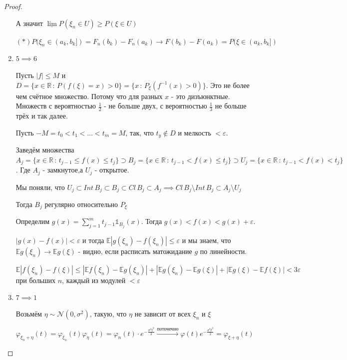 \begin{proof}
\begin{enumerate}
{            А значит $\underline{\lim} P(\xi_n \in U) \geqslant P(\xi \in U)$

            $(*) P(\xi_n \in (a_k, b_k]) = F_n (b_k) - F_n (a_k) \rightarrow F(b_k) - F(a_k) = P(\xi \in (a_k, b_k])$
        }
        \item {
            $5 \implies 6$

            Пусть $|f| \leqslant M$ и $D = \{ x \in \mathbb{R} \, : \, P(f(\xi) = x) > 0 \} = \{ x \, : \, P_{\xi} (f^{-1} (x) > 0) \}$. Это не более чем счётное множество. Потому что для разных $x$ - это дизъюнктные. 
            Множеств с вероятностью $\frac{1}{2}$ - не больше двух, с вероятностью $\frac{1}{3}$ не больше трёх и так далее.

            Пусть $-M = t_0 < t_1 < \ldots < t_m = M$, так, что $t_y \not \in D$ и мелкость $< \varepsilon$.

            Заведём множества $A_j = \{ x \in \mathbb{R} \, : \, t_{j - 1} \leqslant f(x) \leqslant t_j \} \supset B_j = \{ x \in \mathbb{R} \, : \, t_{j - 1} < f(x) \leqslant t_j \} \supset U_j = \{ x \in \mathbb{R} \, : \, t_{j - 1} < f(x) < t_j \}$. Где $A_j$ - замкнутое,а $U_j$ - открытое.

            Мы поняли, что $U_j \subset Int \, B_j \subset B_j \subset Cl \, B_j \subset A_j \implies Cl \, B_j \setminus Int \, B_j \subset A_j \setminus U_j$

            Тогда $B_j$ регулярно относительно $P_\xi$

            Определим $g(x) = \sum_{j = 1}^{m} t_{j - 1} \mathds{1}_{B_j} (x)$. Тогда $g(x) < f(x) < g(x) + \varepsilon$.

            $|g(x) - f(x)| < \varepsilon$ и тогда $\mathbb{E} |g(\xi_n) - f(\xi_n)| \leqslant \varepsilon$ и мы знаем, что $\mathbb{E}g(\xi_n) \rightarrow \mathbb{E}g(\xi)$ - видно, если расписать матожидание $g$ по линейности.

            $\mathbb{E} |f(\xi_n) - f(\xi)| \leqslant |\mathbb{E} f(\xi_n) - \mathbb{E} g(\xi_n)| + |\mathbb{E} g(\xi_n) - \mathbb{E} g(\xi)| + |\mathbb{E} g(\xi) - \mathbb{E} f(\xi) | < 3\varepsilon$ при больших $n$, каждый из модулей $< \varepsilon$
        }
        \item {
            $7 \implies 1$

            Возьмём $\eta \sim \mathcal{N} (0, \sigma^2)$, такую, что $\eta$ не зависит от всех $\xi_n$ и $\xi$

            $\varphi_{\xi_n + \eta} (t) = \varphi_{\xi_n} (t) \varphi_{\eta} (t) = \varphi_{n} (t) \cdot e^{-\frac{\sigma^2 t^2}{2}} \overset{\text{поточечно}}{\rightarrow} \varphi(t) e^{-\frac{\sigma^2t^2}{2}} = \varphi_{\xi + \eta} (t)$

}
\end{enumerate}
\end{proof}
